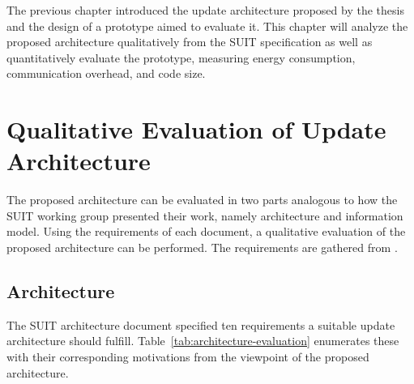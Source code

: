 \documentclass[0-thesis.tex]{subfiles}
\begin{document}
The previous chapter introduced the update architecture proposed by the thesis and the
design of a prototype aimed to evaluate it. This chapter will analyze the proposed
architecture qualitatively from the SUIT specification as well as quantitatively evaluate
the prototype, measuring energy consumption, communication overhead, and code size.

\section{Qualitative Evaluation of Update Architecture}
\label{sec:qual-evaluation}
The proposed architecture can be evaluated in two parts analogous to how the SUIT working
group presented their work, namely architecture and information model. Using the
requirements of each document, a qualitative evaluation of the proposed architecture can
be performed. The requirements are gathered from \parencite{suit-architecture,
suit-information-model}.

\subsection{Architecture}
\label{ssec:arch-evaluation}
The SUIT architecture document specified ten requirements a suitable update architecture
should fulfill. Table~\ref{tab:architecture-evaluation} enumerates these with their
corresponding motivations from the viewpoint of the proposed architecture.
\end{document}

